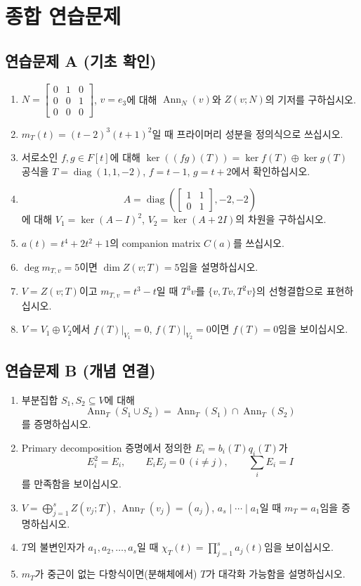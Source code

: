 \chaptersummarytemplate

\section*{종합 연습문제}

\subsection*{연습문제 A (기초 확인)}
\begin{enumerate}[label=A\arabic*.]
\item $N=\begin{bmatrix}0&1&0\\0&0&1\\0&0&0\end{bmatrix}$, $v=e_3$에 대해 $\operatorname{Ann}_N(v)$와 $Z(v;N)$의 기저를 구하십시오.
\item $m_T(t)=(t-2)^3(t+1)^2$일 때 프라이머리 성분을 정의식으로 쓰십시오.
\item 서로소인 $f,g\in F[t]$에 대해 $\ker((fg)(T))=\ker f(T)\oplus\ker g(T)$ 공식을 $T=\operatorname{diag}(1,1,-2)$, $f=t-1$, $g=t+2$에서 확인하십시오.
\item
\[
A=\operatorname{diag}\!\left(\begin{bmatrix}1&1\\0&1\end{bmatrix},-2,-2\right)
\]
에 대해 $V_1=\ker(A-I)^2$, $V_2=\ker(A+2I)$의 차원을 구하십시오.
\item $a(t)=t^4+2t^2+1$의 companion matrix $C(a)$를 쓰십시오.
\item $\deg m_{T,v}=5$이면 $\dim Z(v;T)=5$임을 설명하십시오.
\item $V=Z(v;T)$이고 $m_{T,v}=t^3-t$일 때 $T^3v$를 $\{v,Tv,T^2v\}$의 선형결합으로 표현하십시오.
\item $V=V_1\oplus V_2$에서 $f(T)|_{V_1}=0$, $f(T)|_{V_2}=0$이면 $f(T)=0$임을 보이십시오.
\end{enumerate}

\subsection*{연습문제 B (개념 연결)}
\begin{enumerate}[label=B\arabic*.]
\item 부분집합 $S_1,S_2\subseteq V$에 대해
\[
\operatorname{Ann}_T(S_1\cup S_2)=\operatorname{Ann}_T(S_1)\cap\operatorname{Ann}_T(S_2)
\]
를 증명하십시오.
\item Primary decomposition 증명에서 정의한 $E_i=b_i(T)q_i(T)$가
\[
E_i^2=E_i,\qquad E_iE_j=0\ (i\ne j),\qquad \sum_i E_i=I
\]
를 만족함을 보이십시오.
\item $V=\bigoplus_{j=1}^s Z(v_j;T)$, $\operatorname{Ann}_T(v_j)=(a_j)$, $a_s\mid\cdots\mid a_1$일 때 $m_T=a_1$임을 증명하십시오.
\item $T$의 불변인자가 $a_1,a_2,\dots,a_s$일 때 $\chi_T(t)=\prod_{j=1}^s a_j(t)$임을 보이십시오.
\item $m_T$가 중근이 없는 다항식이면(분해체에서) $T$가 대각화 가능함을 설명하십시오.
\end{enumerate}

